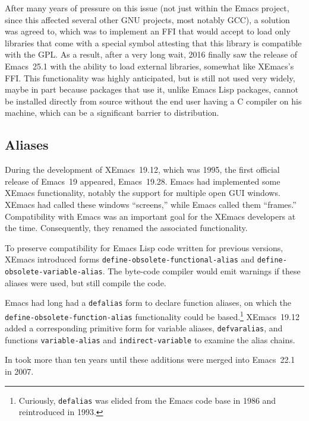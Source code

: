 \documentclass[format=acmsmall,screen]{acmart}
\newcommand \Elisp {Emacs Lisp}
\begin{document}
After many years of pressure on this issue (not just within the Emacs
project, since this affected several other GNU projects, most notably GCC),
a solution was agreed to, which was to implement an FFI that would accept to
load only libraries that come with a special symbol attesting that this
library is compatible with the GPL.  As a result, after a very long wait,
2016 finally saw the release of Emacs~25.1 with the ability to load external
libraries, somewhat like XEmacs's FFI.  This functionality was highly
anticipated, but is still not used very widely, maybe in part because
packages that use it, unlike Emacs Lisp packages, cannot be installed
directly from source without the end user having a C compiler on
his machine, which can be a significant barrier to distribution.

\subsection{Aliases}

During the development of XEmacs~19.12, which was 1995, the first
official release of Emacs~19 appeared, Emacs~19.28.  Emacs had
implemented some XEmacs functionality, notably the support for
multiple open GUI windows.  XEmacs had called these windows
``screens,'' while Emacs called them ``frames.''  Compatibility with
Emacs was an important goal for the XEmacs developers at the time.
Consequently, they renamed the associated functionality.

To preserve compatibility for \Elisp{} code written for previous
versions, XEmacs introduced forms
\texttt{define-obsolete-functional-alias} and
\texttt{define-obsolete-variable-alias}.  The byte-code compiler would
emit warnings if these aliases were used, but still compile the code.

Emacs had long had a \texttt{defalias} form to declare function
aliases, on which the \texttt{define-\linebreak[0]obsolete-\linebreak[0]function-\linebreak[0]alias}
functionality could be based.\footnote{Curiously, \texttt{defalias}
  was elided from the Emacs code base in 1986 and reintroduced in
  1993.}  XEmacs~19.12 added a corresponding primitive form for variable
aliases, \texttt{defvaralias}, and functions \texttt{variable-alias}
and \texttt{indirect-variable} to examine the alias chains.

In took more than ten years until these additions were merged into Emacs~22.1 in 2007.
\end{document}
